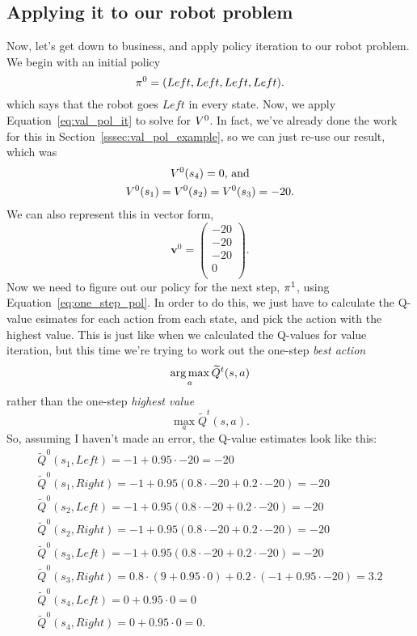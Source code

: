 \documentclass[a4paper]{article}
\begin{document}
\subsection{Applying it to our robot problem}
Now, let's get down to business, and apply policy iteration to our robot
problem.
We begin with an initial policy
\begin{equation*}
  \pi^0 = (Left, Left, Left, Left) .
\end{equation*}
which says that the robot goes $Left$ in every state.
Now, we apply Equation~\ref{eq:val_pol_it} to solve for $V^0$.
In fact, we've already done the work for this in
Section~\ref{sssec:val_pol_example}, so we can just re-use our result,
which was
\begin{gather*}
  V^0(s_4) = 0 \text{, and} \\
  V^0(s_1) = V^0(s_2) = V^0(s_3) = -20 .
\end{gather*}
We can also represent this in vector form,
\begin{equation*}
  \mathbf{v}^0 = \begin{pmatrix}
    -20 \\ -20 \\ -20 \\ 0 \\
  \end{pmatrix} .
\end{equation*}
Now we need to figure out our policy for the next step, $\pi^1$,
using Equation~\ref{eq:one_step_pol}.
In order to do this, we just have to calculate the Q-value esimates
for each action from each state, and pick the action with the highest value.
This is just like when we calculated the Q-values for value iteration,
but this time we're trying to work out the one-step \emph{best action}
$$\operatorname*{arg\,max}_a \widetilde{Q}^t(s, a) $$
rather than the one-step \emph{highest value}
$$\max_a \widetilde{Q}^t(s, a). $$
So, assuming I haven't made an error, the Q-value estimates look like this:
\begin{gather*}
  \widetilde{Q}^0(s_1, Left)  = -1 + 0.95 \cdot -20 = -20 \\
  \widetilde{Q}^0(s_1, Right) = -1 + 0.95 (0.8 \cdot -20 + 0.2 \cdot -20) = -20 \\
  \widetilde{Q}^0(s_2, Left)  = -1 + 0.95 (0.8 \cdot -20 + 0.2 \cdot -20) = -20 \\
  \widetilde{Q}^0(s_2, Right) = -1 + 0.95 (0.8 \cdot -20 + 0.2 \cdot -20) = -20 \\
  \widetilde{Q}^0(s_3, Left)  = -1 + 0.95 (0.8 \cdot -20 + 0.2 \cdot -20) = -20 \\
  \widetilde{Q}^0(s_3, Right) = 0.8 \cdot (9 + 0.95 \cdot 0) + 0.2 \cdot (-1 + 0.95 \cdot -20) = 3.2 \\
  \widetilde{Q}^0(s_4, Left)  = 0 + 0.95 \cdot 0 = 0 \\
  \widetilde{Q}^0(s_4, Right) = 0 + 0.95 \cdot 0 = 0 .
\end{gather*}
\end{document}
